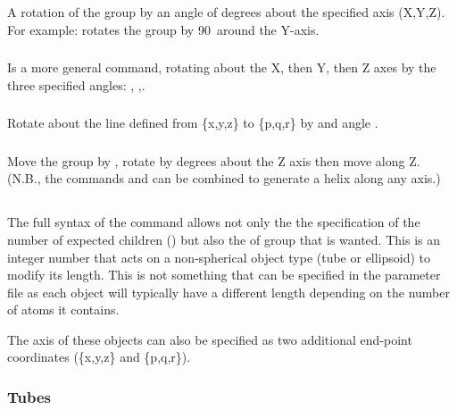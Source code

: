 A rotation of the group by an angle of  degrees about the specified axis
(X,Y,Z).  For example:  rotates the group by 90\dgr\ around the Y-axis. 

\subsubsection{}

Is a more general  command, rotating about the X, then Y, then Z axes by the three
specified angles: , ,.

\subsubsection{}

Rotate about the line defined from \{x,y,z\} to \{p,q,r\} by and angle .

\subsubsection{}

Move the group by , rotate by  degrees about the Z axis then move 
along Z.    (N.B., the commands  and  can be combined to generate a helix
along any axis.)

\subsection{}

The full syntax of the  command allows not only the the specification of the number
of expected children () but also the  of group that is wanted.   This is an
integer number that acts on a non-spherical object type (tube or ellipsoid) to modify its length.  
This is not something that can  be specified in the parameter file as each object will typically
have a different length depending on the number of atoms it contains.

The axis of these objects can also be specified as two additional end-point coordinates
(\{x,y,z\} and \{p,q,r\}).

\subsubsection{Tubes}

